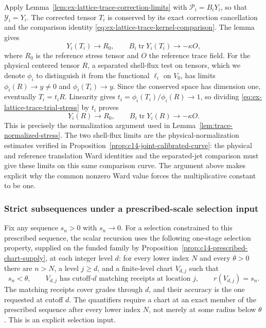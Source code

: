 Apply Lemma~\ref{lem:ex-lattice-trace-correction-limits} with
$\mathcal P_i=B_iY_i$, so that $\mathcal Y_i=Y_i$. The corrected tensor $T_i$ is
conserved by its exact correction cancellation and the comparison identity
\eqref{eq:ex-lattice-trace-kernel-comparison}.  The lemma gives
\begin{equation}
 Y_i(T_i)\longrightarrow R_0,
 \qquad B_i\operatorname{tr}Y_i(T_i)\longrightarrow-\kappa O,
 \label{eq:ex-lattice-trace-trial-stress}
\end{equation}
where $R_0$ is the reference stress tensor and $O$ the reference trace field.
For the physical centered tensor $R$, a separated shell-flux test on
tensors, which we denote $\phi_i$ to distinguish it from the functional
$\ell_i$ on $V_0$, has limits $\phi_i(R)\to y\neq0$ and
$\phi_i(T_i)\to y$. Since the conserved space has dimension one,
eventually $T_i=t_iR$. Linearity gives
$t_i=\phi_i(T_i)/\phi_i(R)\to1$, so dividing
\eqref{eq:ex-lattice-trace-trial-stress} by $t_i$ proves
\[
 Y_i(R)\longrightarrow R_0,
 \qquad B_i\operatorname{tr}Y_i(R)\longrightarrow-\kappa O.
\]
This is precisely the normalization argument used in
Lemma~\ref{lem:trace-normalized-stress}. The two shell-flux limits are the
physical-normalization estimates verified in Proposition~\ref{prop:c14-joint-calibrated-curve}: the physical and reference
translation Ward identities and the separated-jet comparison must give
these limits on this same comparison curve. The argument above makes explicit why the common
nonzero Ward value forces the multiplicative constant to be one.

\subsubsection{Strict subsequences under a prescribed-scale selection input}

Fix any sequence $s_n>0$ with $s_n\to0$. For a selection constrained to
this prescribed sequence, the scalar recursion uses the following one-stage
selection property, supplied on the funded family by Proposition~\ref{prop:c14-prescribed-chart-supply}, at each
integer level $d$: for every lower index $N$ and every $\theta>0$
there are $n>N$, a level $j\ge d$, and a finite-level chart $V_{d,j}$ such
that
\begin{equation}
 s_n<\theta,\qquad
 V_{d,j}\text{ has cutoff-}d\text{ matching receipts at location }j,
 \qquad r(V_{d,j})=s_n.
 \label{eq:ex-lattice-trace-one-stage}
\end{equation}
The matching receipts cover grades through $d$, and their accuracy is the
one requested at cutoff $d$. The quantifiers require a chart at an exact
member of the prescribed sequence after every lower index $N$, not merely
at some radius below $\theta$. This is an explicit selection input.

